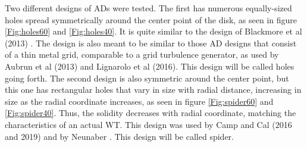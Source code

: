 Two different designs of \gls{AD}s were tested. The first has numerous equally-sized holes spread symmetrically around the center point of the disk, as seen in figure \ref{Fig:holes60} and \ref{Fig:holes40}. It is quite similar to the design of Blackmore et al (2013) \cite{Blackmore2013}. The design is also meant to be similar to those \gls{AD} designs that consist of a thin metal grid, comparable to a grid turbulence generator, as used by Aubrun et al (2013) \cite{Aubrun2013} and Lignarolo et al (2016)\cite{Lignarolo2016}. This design will be called \gls{holes} going forth. The second design is also symmetric around the center point, but this one has rectangular holes that vary in size with radial distance, increasing in size as the radial coordinate increases, as seen in figure \ref{Fig:spider60} and \ref{Fig:spider40}. Thus, the solidity decreases with radial coordinate, matching the characteristics of an actual WT. This design was used by Camp and Cal (2016 and 2019) \cite{Camp2016} \cite{Camp2019} and by Neunaber \cite{Neunaber}. This design will be called \gls{spider}. 



